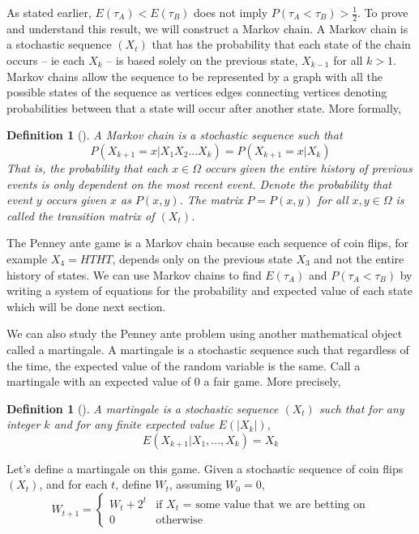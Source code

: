 \documentclass{article}
\newtheorem{definition}[theorem]{Definition}
\numberwithin{mytheorem}{subsection} %
\begin{document}
		As stated earlier, $E(\tau_A) < E(\tau_B)$ does not imply $P(\tau_A < \tau_B) > \frac{1}{2}$. To prove and understand this result, we will construct a Markov chain. A Markov chain is a stochastic sequence $(X_t)$ that has the probability that each state of the chain occurs -- ie each $X_k$ -- is based solely on the previous state, $X_{k-1}$ for all $k > 1$. Markov chains allow the sequence to be represented by a graph with all the possible states of the sequence as vertices edges connecting vertices denoting probabilities between that a state will occur after another state. More formally,

		\begin{definition}[\cite{textbook}]
			A Markov chain is a stochastic sequence such that
			$$P(X_{k+1} = x | X_1X_2...X_k) = P(X_{k+1} = x  | X_k)$$
			That is, the probability that each $x \in \Omega$ occurs given the entire history of
			previous events is only dependent on the most recent event. Denote the probability
			that event $y$ occurs given $x$ as $P(x,y)$. The matrix $P = P(x,y)$ for all $x,y \in \Omega$ is called the transition matrix of $(X_t)$.
		\end{definition}

		The Penney ante game is a Markov chain because each sequence of coin flips, for example $X_4=HTHT$, depends only on the previous state $X_3$ and not the entire history of states. We can use Markov chains to find $E(\tau_A)$ and $P(\tau_A < \tau_B)$ by writing a system of equations for the probability and expected value of each state which will be done next section. 

		We can also study the Penney ante problem using another mathematical object called a martingale. A martingale is a stochastic sequence such that regardless of the time, the expected value of the random variable is the same. Call a martingale with an expected value of 0 a fair game. More precisely,

		\begin{definition}[\cite{li}]
			A martingale is a stochastic sequence $(X_t)$ such that for any
			integer $k$ and for any finite expected value $E(|X_k|)$, $$E(X_{k+1} | X_1, ..., X_k) = X_k$$		
		\end{definition}

	    Let's define a martingale on this game. Given a stochastic sequence of coin flips $(X_t)$, and for each $t$, define $W_t$, assuming $W_0=0$,
	    \[ W_{t+1}=\begin{cases} 
	      W_{t} + 2^t & \text{if $X_t$ = some value that we are betting on}\\
	      0 & \text{otherwise} 
		  \end{cases} \]
\end{document}
